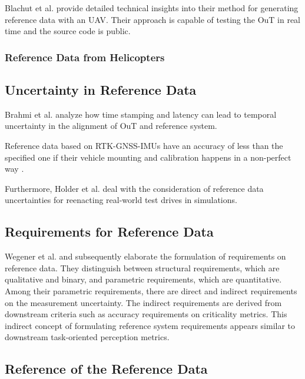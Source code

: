 \documentclass[conference]{IEEEtran}
\newcommand{\new}[1]{{\color{my-red}#1}}
\begin{document}
Blachut et al. \cite{Blachut2022} provide detailed technical insights into their method for generating reference data with an UAV. 
Their approach is capable of testing the OuT in real time and the source code is public. 

\subsubsection{Reference Data from Helicopters}
\label{sec:ref_data_helicopters}

\subsection{Uncertainty in Reference Data}
\label{sec:ref_data_uncertainty}

Brahmi et al. \cite{Brahmi2013timestamping} analyze how time stamping and latency can lead to temporal uncertainty in the alignment of OuT and reference system.

Reference data based on RTK-GNSS-IMUs have an accuracy of less than the specified one if their vehicle mounting and calibration happens in a non-perfect way \cite{Holder2022calibration, Brahmi2020diss}.

Furthermore, Holder et al. \cite{Holder2022calibration} deal with the consideration of reference data uncertainties for reenacting real-world test drives in simulations.

\subsection{\new{Requirements for Reference Data}}
\label{sec:ref_data_requirements}

Wegener et al. \cite{Wegener2012requirements} and subsequently \cite[Sec. 8]{Brahmi2020diss} elaborate the formulation of requirements on reference data. 
They distinguish between structural requirements, which are qualitative and binary, and parametric requirements, which are quantitative. 
Among their parametric requirements, there are direct and indirect requirements on the measurement uncertainty. 
The indirect requirements are derived from downstream criteria such as accuracy requirements on criticality metrics. 
This indirect concept of formulating reference system requirements appears similar to downstream task-oriented perception metrics. 

\subsection{\new{Reference of the Reference Data}}
\end{document}

